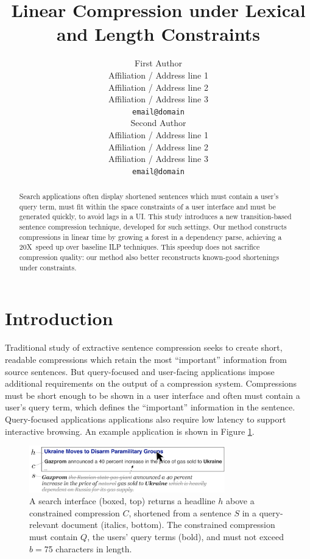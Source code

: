 \documentclass[11pt,a4paper]{article}
\title{Linear Compression under Lexical and Length Constraints}
\author{First Author \\
  Affiliation / Address line 1 \\
  Affiliation / Address line 2 \\
  Affiliation / Address line 3 \\
  {\tt email@domain} \\\And
  Second Author \\
  Affiliation / Address line 1 \\
  Affiliation / Address line 2 \\
  Affiliation / Address line 3 \\
  {\tt email@domain} \\}
\date{}
\newcommand{\speedup}[0]{20X~}
\begin{document}
\maketitle

\begin{abstract}
Search applications often display shortened sentences which must contain a user's query term, must fit within the space constraints of a user interface and must be generated quickly, to avoid lags in a UI. This study introduces a new transition-based sentence compression technique, developed for such settings. Our method constructs compressions in linear time by growing a forest in a dependency parse, achieving a \speedup speed up over baseline ILP techniques. This speedup does not sacrifice compression quality: our method also better reconstructs known-good shortenings under constraints.
\end{abstract}

\section{Introduction}\label{s:intro}

Traditional study of extractive sentence compression seeks to create short, readable compressions which retain the most ``important'' information from source sentences. But query-focused and user-facing applications impose additional requirements on the output of a compression system. Compressions must be short enough to be shown in a user interface and often must contain a user's query term, which defines the ``important'' information in the sentence. Query-focused applications applications also require low latency to support interactive browsing. An example application is shown in Figure \ref{f:qf}.

\begin{figure}[htb!]
\includegraphics[width=8.5cm]{qf.pdf}
\caption{A search interface (boxed, top) returns a headline $h$ above a constrained compression $C$, shortened from a sentence $S$ in a query-relevant document (italics, bottom). The constrained compression must contain $Q$, the users' query terms (bold), and must not exceed $b=$75 characters in length.}
\label{f:qf}
\end{figure}
\end{document}
